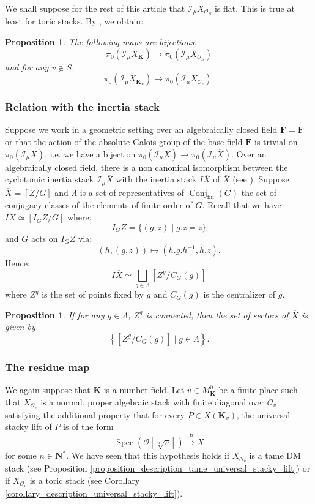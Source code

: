 \documentclass{proc-l}
\newcommand{\K}{\mathbf{K}}
\newcommand{\N}{\mathbf{N}}
\newcommand{\F}{\mathbf{F}}
\DeclareMathOperator{\Conj}{Conj}
\DeclareMathOperator{\Spec}{Spec}
\newcommand{\sheafI}{\mathcal{I}}
\newcommand{\sheafO}{\mathcal{O}}
\newtheorem{prop}[theorem]{Proposition}
\theoremstyle{definition}
\theoremstyle{remark}
\numberwithin{equation}{section}
\begin{document}
We shall suppose for the rest of this article that $\sheafI_{\mu} X_{\sheafO_S}$ is flat. This is true at least for toric stacks. By \cite[corollary 2.8]{darda2024batyrevmanin}, we obtain:
\begin{prop}\label{prop_sector_over_ring_of_integer}
    The following maps are bijections:$$\pi_0(\sheafI_{\mu} X_{\K}) \rightarrow \pi_0(\sheafI_{\mu} X_{\sheafO_S}) $$and for any $v \not\in S$, $$\pi_0(\sheafI_{\mu} X_{\K_v}) \rightarrow \pi_0(\sheafI_{\mu} X_{\sheafO_v}) .$$
\end{prop}


\subsubsection{Relation with the inertia stack}

Suppose we work in a geometric setting over an algebraically closed field $\F = \overline{\F}$ or that the action of the absolute Galois group of the base field $\F$ is trivial on $\pi_0(\sheafI_{\mu} X)$, i.e. we have a bijection $\pi_0(\sheafI_{\mu} X) \rightarrow \pi_0(\sheafI_{\mu} \overline{X})$. Over an algebraically closed field, there is a non canonical isomorphism between the cyclotomic inertia stack $\sheafI_{\mu} \overline{X}$ with the inertia stack $I \overline{X}$ of $\overline{X}$ (see \cite[proposition 22]{yasuda2004motivicintegrationdelignemumfordstacks}). Suppose $\overline{X} = [Z/G]$ and $\Lambda$ is a set of representatives of $\Conj_{\text{fin}}(G)$ the set of conjugacy classes of the elements of finite order of $G$. Recall that we have $I \overline{X} \simeq [ I_G Z / G ]$ where:
$$ I_G Z = \{ (g,z) \mid g.z = z \}$$ and $G$ acts on $I_G Z$ via:
$$ (h, (g,z)) \longmapsto (h.g.h^{-1},h.z) .$$Hence:
$$I \overline{X} \simeq \bigsqcup\limits_{g \in \Lambda} [Z^g / C_G(g) ]$$where $Z^g$ is the set of points fixed by $g$ and $C_G(g)$ is the centralizer of $g$.

\begin{prop}
    If for any $g \in \Lambda$, $Z^g$ is connected, then the set of sectors of $\overline{X}$ is given by $$\left\{ [Z^g / C_G(g) ] \mid g \in \Lambda \right\} .$$
\end{prop}

\subsubsection{The residue map}\label{subsubsection_the_residue_map_definition}

We again suppose that $\K$ is a number field. Let $v \in M_{\K}^0$ be a finite place such that $X_{\sheafO_v}$ is a normal, proper algebraic stack with finite diagonal over $\sheafO_v$ satisfying the additional property that for every $P \in X(\K_v)$, the universal stacky lift of $P$ is of the form
$$
\Spec(\sheafO[\sqrt[n]{v}]) \xrightarrow{\overline P} X
$$
for some $n \in \N^*$. We have seen that this hypothesis holds if $X_{\sheafO_v}$ is a tame DM stack (see Proposition \ref{proposition_description_tame_universal_stacky_lift}) or if $X_{\sheafO_v}$ is a toric stack (see Corollary \ref{corollary_description_universal_stacky_lift}).
\end{document}
